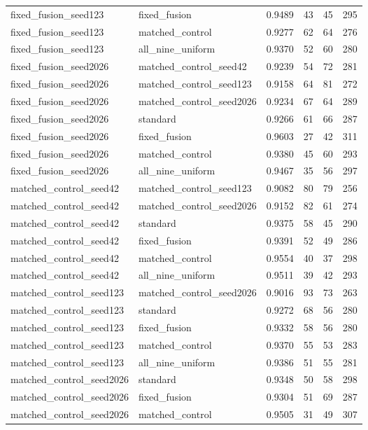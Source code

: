 \begin{tabular}{llrrrr}
fixed\_fusion\_seed123 & fixed\_fusion & 0.9489 & 43 & 45 & 295 \\
fixed\_fusion\_seed123 & matched\_control & 0.9277 & 62 & 64 & 276 \\
fixed\_fusion\_seed123 & all\_nine\_uniform & 0.9370 & 52 & 60 & 280 \\
fixed\_fusion\_seed2026 & matched\_control\_seed42 & 0.9239 & 54 & 72 & 281 \\
fixed\_fusion\_seed2026 & matched\_control\_seed123 & 0.9158 & 64 & 81 & 272 \\
fixed\_fusion\_seed2026 & matched\_control\_seed2026 & 0.9234 & 67 & 64 & 289 \\
fixed\_fusion\_seed2026 & standard & 0.9266 & 61 & 66 & 287 \\
fixed\_fusion\_seed2026 & fixed\_fusion & 0.9603 & 27 & 42 & 311 \\
fixed\_fusion\_seed2026 & matched\_control & 0.9380 & 45 & 60 & 293 \\
fixed\_fusion\_seed2026 & all\_nine\_uniform & 0.9467 & 35 & 56 & 297 \\
matched\_control\_seed42 & matched\_control\_seed123 & 0.9082 & 80 & 79 & 256 \\
matched\_control\_seed42 & matched\_control\_seed2026 & 0.9152 & 82 & 61 & 274 \\
matched\_control\_seed42 & standard & 0.9375 & 58 & 45 & 290 \\
matched\_control\_seed42 & fixed\_fusion & 0.9391 & 52 & 49 & 286 \\
matched\_control\_seed42 & matched\_control & 0.9554 & 40 & 37 & 298 \\
matched\_control\_seed42 & all\_nine\_uniform & 0.9511 & 39 & 42 & 293 \\
matched\_control\_seed123 & matched\_control\_seed2026 & 0.9016 & 93 & 73 & 263 \\
matched\_control\_seed123 & standard & 0.9272 & 68 & 56 & 280 \\
matched\_control\_seed123 & fixed\_fusion & 0.9332 & 58 & 56 & 280 \\
matched\_control\_seed123 & matched\_control & 0.9370 & 55 & 53 & 283 \\
matched\_control\_seed123 & all\_nine\_uniform & 0.9386 & 51 & 55 & 281 \\
matched\_control\_seed2026 & standard & 0.9348 & 50 & 58 & 298 \\
matched\_control\_seed2026 & fixed\_fusion & 0.9304 & 51 & 69 & 287 \\
matched\_control\_seed2026 & matched\_control & 0.9505 & 31 & 49 & 307 \\

\end{tabular}
